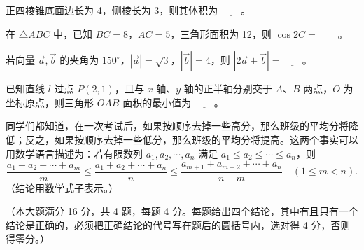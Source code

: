 \begin{question}
正四棱锥底面边长为 4，侧棱长为 3，则其体积为 $\underline{\qquad}$。

\end{question}
\begin{question}
在 $\triangle ABC$ 中，已知 $BC=8$，$AC=5$，三角形面积为 12，则 $\cos 2C=\underline{\qquad}$。

\end{question}
\begin{question}
若向量 $\vec a,\vec b$ 的夹角为 $150^\circ$，$|\vec a|=\sqrt3$，$|\vec b|=4$，则 $|2\vec a+\vec b|=\underline{\qquad}$。

\end{question}
\begin{question}
已知直线 $l$ 过点 $P(2,1)$，且与 $x$ 轴、$y$ 轴的正半轴分别交于 $A\text{、}B$ 两点，$O$ 为坐标原点，则三角形 $OAB$ 面积的最小值为 $\underline{\qquad}$。

\end{question}
\begin{question}
同学们都知道，在一次考试后，如果按顺序去掉一些高分，那么班级的平均分将降低；反之，如果按顺序去掉一些低分，那么班级的平均分将提高。这两个事实可以用数学语言描述为：若有限数列 $a_1,a_2,\cdots,a_n$ 满足 $a_1\leq a_2\leq\cdots\leq a_n$，则
\nopagebreak[4]
\[
\frac{a_1+a_2+\cdots+a_m}{m}\leq\frac{a_1+a_2+\cdots+a_n}{n}\leq\frac{a_{m+1}+a_{m+2}+\cdots+a_n}{n-m}\quad(1\leq m<n).
\]
（结论用数学式子表示。）

\end{question}

（本大题满分 16 分，共 4 题，每题 4 分。每题给出四个结论，其中有且只有一个结论是正确的，必须把正确结论的代号写在题后的圆括号内，选对得 4 分，否则得零分。）

